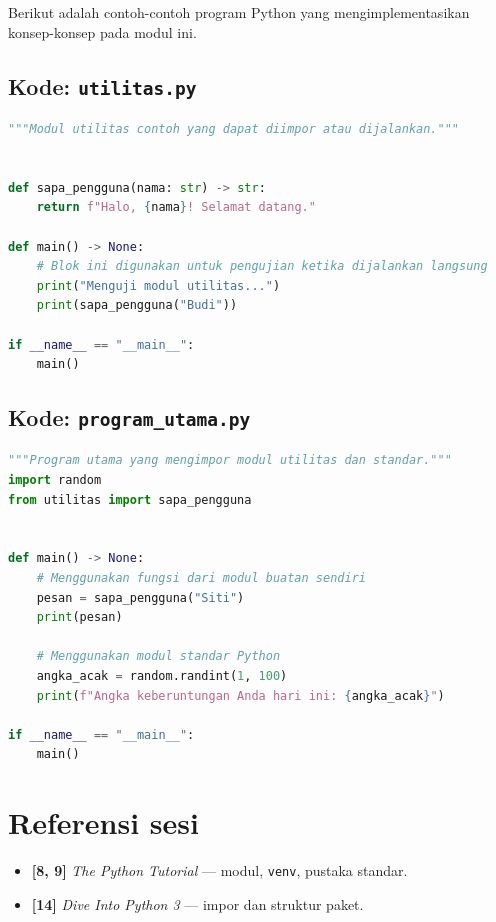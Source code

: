 \documentclass[../main.tex]{subfiles}
\begin{document}
Berikut adalah contoh-contoh program Python yang mengimplementasikan konsep-konsep pada modul ini.

\subsection{Kode: \texttt{utilitas.py}}
\introstudikasuskode
\begin{lstlisting}[language=Python,caption={\texttt{utilitas.py}}]
"""Modul utilitas contoh yang dapat diimpor atau dijalankan."""


def sapa_pengguna(nama: str) -> str:
    return f"Halo, {nama}! Selamat datang."

def main() -> None:
    # Blok ini digunakan untuk pengujian ketika dijalankan langsung
    print("Menguji modul utilitas...")
    print(sapa_pengguna("Budi"))

if __name__ == "__main__":
    main()
\end{lstlisting}

\subsection{Kode: \texttt{program\_utama.py}}
\introstudikasuskode
\begin{lstlisting}[language=Python,caption={\texttt{program\_utama.py}}]
"""Program utama yang mengimpor modul utilitas dan standar."""
import random
from utilitas import sapa_pengguna


def main() -> None:
    # Menggunakan fungsi dari modul buatan sendiri
    pesan = sapa_pengguna("Siti")
    print(pesan)
    
    # Menggunakan modul standar Python
    angka_acak = random.randint(1, 100)
    print(f"Angka keberuntungan Anda hari ini: {angka_acak}")

if __name__ == "__main__":
    main()
\end{lstlisting}

\section{Referensi sesi}

\begin{itemize}[leftmargin=*]
  \item \textbf{[8, 9]} \textit{The Python Tutorial} --- modul, \texttt{venv}, pustaka standar.
  \item \textbf{[14]} \textit{Dive Into Python 3} --- impor dan struktur paket.
\end{itemize}
\end{document}
